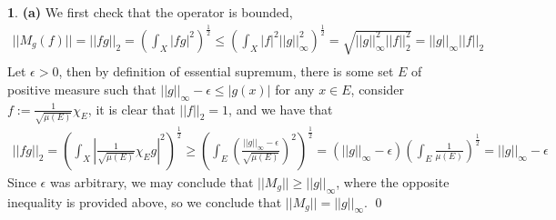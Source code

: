 \documentclass[11pt]{article}
\theoremstyle{definition}
\newtheorem{pb}{}
\newcommand{\abs}[1]{\left\vert#1\right\vert}
\newcommand{\norm}[1]{\lvert\lvert#1\rvert\rvert}
\begin{document}
    \begin{pb}
        \textbf{(a)} We first check that the operator is bounded,
        \begin{align*}
            \norm{M_g(f)} = \norm{fg}_2 = \left(\int_X \abs{fg}^2\right)^{\frac12} \leq \left(\int_X \abs{f}^2\norm{g}^2_\infty\right)^{\frac12} = \sqrt{\norm{g}_\infty^2\norm{f}_2^2} = \norm{g}_\infty\norm{f}_2\\
        \end{align*}
        Let \(\epsilon > 0\), then by definition of essential supremum, there is some set \(E\) of positive measure such that \(\norm{g}_\infty - \epsilon \leq \abs{g(x)}\) for any \(x \in E\), consider \(f := \frac{1}{\sqrt{\mu(E)}}\chi_E\), it is clear that \(\norm{f}_2 = 1\), and we have that
        \begin{align*}
            \norm{fg}_2 = \left(\int_X \abs{\frac{1}{\sqrt{\mu(E)}}\chi_E g}^2\right)^{\frac12} \geq \left(\int_E\left(\frac{\norm{g}_\infty - \epsilon}{\sqrt{\mu(E)}}\right)^2 \right)^{\frac12} = (\norm{g}_\infty - \epsilon)\left(\int_E \frac{1}{\mu(E)}\right)^{\frac12} = \norm{g}_\infty - \epsilon
        \end{align*}
        Since \(\epsilon\) was arbitrary, we may conclude that \(\norm{M_g} \geq \norm{g}_\infty\), where the opposite inequality is provided above, so we conclude that \(\norm{M_g} = \norm{g}_\infty\). \qed
    \end{pb}
\end{document}
